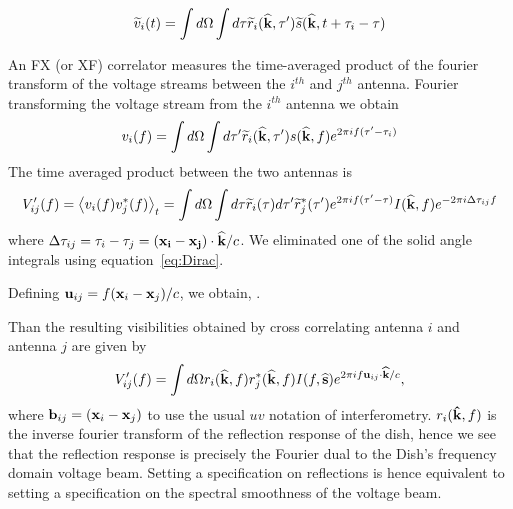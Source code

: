 \documentclass[onecolumn]{emulateapj}
\begin{document}
\begin{equation}
\widetilde{v}_i(t) = \int d \Omega \int d \tau \widetilde{r}_i({\bf \widehat{k}},\tau') \widetilde{s}({\bf \widehat{k}},t+\tau_i - \tau)
\end{equation}

 An FX (or XF) correlator measures the time-averaged product of the fourier transform of the voltage streams between the $i^{th}$ and $j^{th}$ antenna. Fourier transforming the voltage stream from the $i^{th}$ antenna we obtain
\begin{equation}
v_i(f) = \int d \Omega \int d \tau' \widetilde{r}_i({\bf \widehat{k}},\tau') s({\bf \widehat{k}},f)e^{2 \pi i f(\tau'-\tau_i)}
\end{equation}
The time averaged product between the two antennas is
\begin{equation}
V_{ij}'(f) = \left \langle v_i(f) v_j^*(f) \right \rangle_t = \int d \Omega \int d \tau \widetilde{r}_i(\tau) d \tau' \widetilde{r}^*_j(\tau')e^{2 \pi i f (\tau'-\tau) } I({\bf \widehat{k}}, f) e^{- 2 \pi i \Delta \tau_{ij}f} 
\end{equation}
where $\Delta \tau_{ij} = \tau_i-\tau_j = ({\bf x_i - x_j}) \cdot {\bf \widehat{k}}/c$. We eliminated one of the solid angle integrals using equation~\ref{eq:Dirac}. 

Defining ${\bf u}_{ij} = f ({\bf x}_i-{\bf x}_j)/c$, we obtain,
.

 
 

Than the resulting visibilities obtained by cross correlating antenna $i$ and antenna $j$ are given by 
\begin{equation}\label{eq:Visibility}
V'_{ij}(f) =  \int d \Omega r_i({\bf \widehat{k}},f) r^*_j({\bf \widehat{k}},f)  I(f,{\bf \widehat{s}})e^{2 \pi i f {\bf u}_{ij} \cdot {\bf \widehat{k}}/c},
\end{equation}
where ${\bf b}_{ij} = ({\bf x}_i - {\bf x}_j )$ to use the usual $uv$ notation of interferometry. $r_i({\bf \hat{k}},f)$ is the inverse fourier transform of the reflection response of the dish, hence we see that the reflection response is precisely the Fourier dual to the Dish's frequency domain voltage beam. Setting a specification on reflections is hence equivalent to setting a specification on the spectral smoothness of the voltage beam. 
\end{document}
